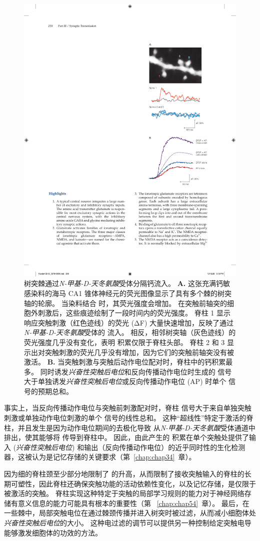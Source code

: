 \begin{figure}[htbp]
	\centering
	\includegraphics[width=0.4\linewidth]{chap13/fig_13_18}
	\caption{树突棘通过\textit{N-甲基-D-天冬氨酸}受体分隔钙流入。
		\textbf{A.} 这张充满钙敏感染料的海马 CA1 锥体神经元的荧光图像显示了具有多个棘的树突轴的轮廓。
		当染料结合  时，其荧光强度会增加。
		在突触前轴突的细胞外刺激后，这些痕迹绘制了一段时间内的荧光强度。
		脊柱 1 显示响应突触刺激（红色迹线）的荧光 (ΔF) 大量快速增加，反映了通过\textit{N-甲基-D-天冬氨酸}受体的  流入。
		相反，相邻树突轴（灰色迹线）的荧光强度几乎没有变化，表明  积累仅限于脊柱头部。
		脊柱 2 和 3 显示出对突触刺激的荧光几乎没有增加，因为它们的突触前轴突没有被激活\cite{lang2004transient}。 
		\textbf{B.} 当突触刺激与突触后动作电位配对时，脊柱中的钙积累最多。
		同时诱发\textit{兴奋性突触后电位}和反向传播动作电位时生成的  信号大于单独诱发\textit{兴奋性突触后电位}或反向传播动作电位 (AP) 时单个  信号的预期总和\cite{yuste1995dendritic}。}
	\label{fig:13_18}
\end{figure}


事实上，当反向传播动作电位与突触前刺激配对时，脊柱  信号大于来自单独突触刺激或单独动作电位刺激的单个  信号的线性总和。
这种“超线性”特定于激活的脊柱，并且发生是因为动作电位期间的去极化导致  从\textit{N-甲基-D-天冬氨酸}受体通道中排出，使其能够将  传导到脊柱中。
因此，由此产生的  积累在单个突触处提供了输入 (\textit{兴奋性突触后电位}) 和输出（反向传播动作电位）的近乎同时性的生化检测器，这被认为是记忆存储的关键要求（第~\ref{chap:chap34}~章）。


因为细的脊柱颈至少部分地限制了  的升高，从而限制了接收突触输入的脊柱的长期可塑性，因此脊柱还确保突触功能的活动依赖性变化，以及记忆存储，是仅限于被激活的突触。
脊柱实现这种特定于突触的局部学习规则的能力对于神经网络存储有意义信息的能力可能具有根本的重要性（第 ~\ref{chap:chap54}~章）。
最后，在一些棘中，局部突触电位在通过棘颈传播并进入树突时被过滤，从而减小细胞体处\textit{兴奋性突触后电位}的大小。
这种电过滤的调节可以提供另一种控制给定突触电导能够激发细胞体的功效的方法。



